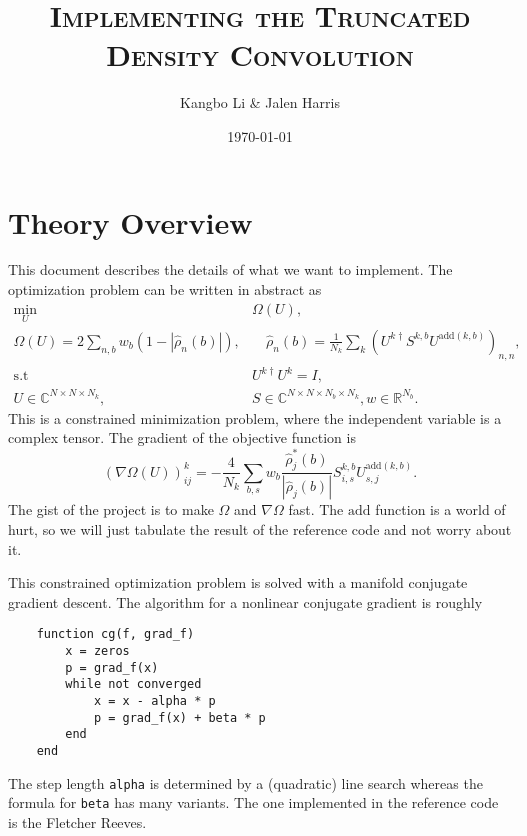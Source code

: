 \documentclass[a4paper, 12pt]{article}
\title{\scshape Implementing the Truncated Density Convolution}
\author{\normalsize Kangbo Li \& Jalen Harris}
\date{\normalsize \today}
\begin{document}
\maketitle

\section{Theory Overview}%
\label{sec:Theory Overview}

This document describes the details of what we want to implement. 
The optimization problem can be written in abstract as 
\begin{align}
        \min_{U}\; &  \Omega(U),\\
        \Omega(U) = 2 \sum_{n, b} w_b (1 - |\hat{\rho}_n(b)|),& \quad \hat{\rho}_n(b) = \frac{1}{N_k}  \sum_k (U^{k \dagger} S^{k, b} U^{\mathrm{add}(k, b)})_{n,n},\\
        \mathrm{s.t}\; & U^{k \dagger} U^{k} = I,\\
        U \in \mathbb{C}^{N \times N \times N_k },& S \in \mathbb{C}^{N \times N \times N_b \times N_k}, 
        w \in \mathbb{R}^{N_b}\label{eq:dimensions}.
\end{align}
This is a constrained minimization problem, where the independent variable  is
a complex tensor. The gradient of the objective function is 
\begin{equation}
    (\nabla \Omega(U))^k_{ij} = - \frac{4}{N_k}  \sum_{b, s} w_b \frac{\hat{\rho}_j^*(b)}{|\hat{\rho}_j(b)|} S_{i, s}^{k, b} U_{s, j}^{\mathrm{add}(k, b)}.
\end{equation}
The gist of the project is to make $\Omega$ and $\nabla \Omega$ fast. The
$\mathrm{add}$ function is  a world of hurt, so we will just tabulate the
result of the reference code and not worry about it.

This constrained optimization problem is solved with a manifold conjugate
gradient descent. The algorithm for a nonlinear conjugate gradient is roughly
\vspace{-0.5cm}
\begin{verbatim}
    function cg(f, grad_f)
        x = zeros
        p = grad_f(x)
        while not converged
            x = x - alpha * p
            p = grad_f(x) + beta * p
        end
    end
\end{verbatim}
\vspace{-0.5cm}
The step length \texttt{alpha} is determined by a (quadratic) line search
whereas the formula for \texttt{beta} has many variants.  The one implemented
in the reference code is the Fletcher Reeves.
\end{document}

